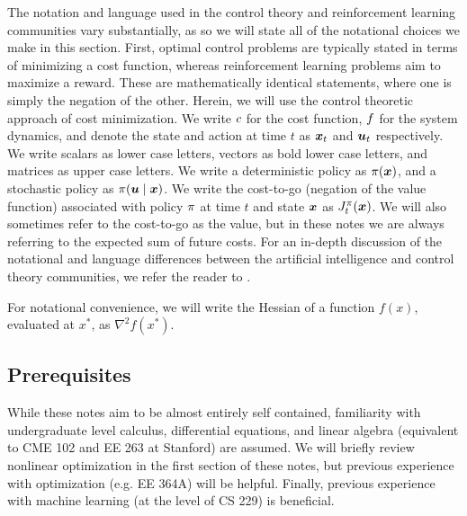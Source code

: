 The notation and language used in the control theory and reinforcement learning communities vary substantially, as so we will state all of the notational choices we make in this section. First, optimal control problems are typically stated in terms of minimizing a cost function, whereas reinforcement learning problems aim to maximize a reward. These are mathematically identical statements, where one is simply the negation of the other. Herein, we will use the control theoretic approach of cost minimization. We write $c$ for the cost function, $f$ for the system dynamics, and denote the state and action at time $t$ as $\bm{x}_t$ and $\bm{u}_t$ respectively. We write scalars as lower case letters, vectors as bold lower case letters, and matrices as upper case letters. We write a deterministic policy as $\pi(\bm{x})$, and a stochastic policy as $\pi(\bm{u}\mid\bm{x})$.
We write the cost-to-go (negation of the value function) associated with policy $\pi$ at time $t$ and state $\bm{x}$ as $J^\pi_t(\bm{x})$. We will also sometimes refer to the cost-to-go as the value, but in these notes we are always referring to the expected sum of future costs. 
For an in-depth discussion of the notational and language differences between the artificial intelligence and control theory communities, we refer the reader to \cite{powell2012ai}.

For notational convenience, we will write the Hessian of a function $f(x)$, evaluated at $x^*$, as $\nabla^2 f(x^*)$.

\subsection*{Prerequisites}

While these notes aim to be almost entirely self contained, familiarity with undergraduate level calculus, differential equations, and linear algebra (equivalent to CME 102 and EE 263 at Stanford) are assumed. We will briefly review nonlinear optimization in the first section of these notes, but previous experience with optimization (e.g. EE 364A) will be helpful. Finally, previous experience with machine learning (at the level of CS 229) is beneficial. 